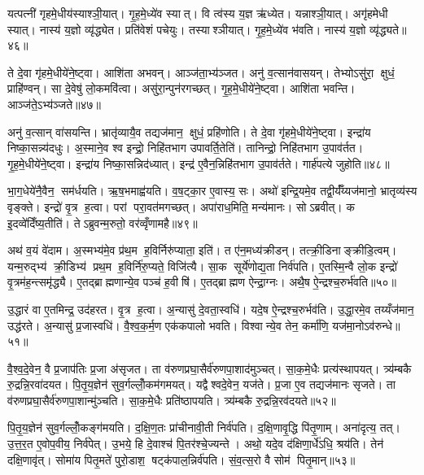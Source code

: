 यत्पत्नी॑ गृहमे॒धीय॑स्याश्ञी॒यात्। गृ॒ह॒मे॒ध्ये॑व स्यात्। वि त्व॑स्य य॒ज्ञ ऋ॑ध्येत। यन्नाश्ञी॒यात्। अगृ॑हमेधी स्यात्। नास्य॑ य॒ज्ञो व्यृ॑द्ध्येत। प्रति॑वेशं पचेयुः। तस्याश्ञीयात्। गृ॒ह॒मे॒ध्ये॑व भ॑वति। नास्य॑ य॒ज्ञो व्यृ॑द्ध्यते॥४६॥

ते दे॒वा गृ॑हमे॒धीये॑ने॒ष्ट्वा। आशि॑ता अभवन्। आञ्ज॑ता॒भ्य॑ञ्जत। अनु॑ व॒त्सान॑वासयन्। तेभ्योऽसु॑रा॒ क्षुधं॒ प्राहि॑ण्वन्। सा दे॒वेषु॑ लो॒कमवि॑त्वा। असु॑रा॒न्पुन॑रगच्छत्। गृ॒ह॒मे॒धीये॑ने॒ष्ट्वा। आशि॑ता भवन्ति। आञ्ज॑ते॒ऽभ्य॑ञ्जते॥४७॥

अनु॑ व॒त्सान् वा॑सयन्ति। भ्रातृ॑व्यायै॒व तद्यज॑मान॒ क्षुधं॒ प्रहि॑णोति। ते दे॒वा गृ॑हमे॒धीये॑ने॒ष्ट्वा। इन्द्रा॑य निष्का॒सन्न्य॑दधुः। अ॒स्माने॒व श्व इन्द्रो॒ निहि॑तभाग उपावर्ति॒तेति॑। तानिन्द्रो॒ निहि॑तभाग उ॒पाव॑र्तत। गृ॒ह॒मे॒धीये॑ने॒ष्ट्वा। इन्द्रा॑य निष्का॒सन्निद॑ध्यात्। इन्द्र॑ ए॒वैन॒न्निहि॑तभाग उ॒पाव॑र्तते। गार्\mbox{}ह॑पत्ये जुहोति॥४८॥

भा॒ग॒धेये॑नै॒वैन॒ सम॑र्धयति। ऋ॒ष॒भमाह्व॑यति। व॒ष॒ट्का॒र ए॒वास्य॒ सः। अथो॑ इन्द्रि॒यमे॒व तद्वी॒र्यँ॑य्यज॑मानो॒ भ्रातृव्य॑स्य वृङ्क्ते। इन्द्रो॑ वृ॒त्र ह॒त्वा। परां परा॒वत॑मगच्छत्। अपा॑राध॒मिति॒ मन्य॑मानः। सोऽब्रवीत्। क इ॒दव्वे॑दिँष्य॒तीति॑। तेऽब्रुवन्म॒रुतो॒ वर॑व्वृँणामहै॥४९॥

अथ॑ व॒यं वे॑दाम। अ॒स्मभ्य॑मे॒व प्र॑थ॒म ह॒विर्निरु॑प्याता॒ इति॑। त ए॑न॒मध्य॑क्रीडन्। तत्क्री॒डिनाङ्क्रीडि॒त्वम्। यन्म॒रुद्भ्य॑ क्री॒डिभ्य॑ प्रथ॒म ह॒विर्नि॑रु॒प्यते॒ विजि॑त्यै। सा॒क सूर्ये॑णोद्य॒ता निर्व॑पति। ए॒तस्मि॒न्वै लो॒क इन्द्रो॑ वृ॒त्रम॑ह॒न्त्समृ॑द्ध्यै। ए॒तद्ब्राह्मणान्ये॒व पञ्च॑ ह॒वीषि॑। ए॒तद्ब्राह्मण ऐन्द्रा॒ग्नः। अथै॒ष ऐ॒न्द्रश्च॒रुर्भ॑वति॥५०॥

उ॒द्धारं वा ए॒तमिन्द्र॒ उद॑हरत। वृ॒त्र ह॒त्वा। अ॒न्यासु॑ दे॒वता॒स्वधि॑। यदे॒ष ऐ॒न्द्रश्च॒रुर्भव॑ति। उ॒द्धा॒रमे॒व तय्यँज॑मान॒ उद्ध॑रते। अ॒न्यासु॑ प्र॒जास्वधि॑। वै॒श्व॒क॒र्म॒ण एक॑कपालो भवति। विश्वान्ये॒व तेन॒ कर्मा॑णि॒ यज॑मा॒नोऽव॑रुन्धे॥५१॥\anuvakamend[ऋ॒द्ध्य॒ते॒ऽभ्य॑ञ्जते जुहोति वृणामहै भवत्य॒ष्टौ च॑]

वै॒श्व॒दे॒वेन॒ वै प्र॒जाप॑तिः प्र॒जा अ॑सृजत। ता व॑रुणप्रघा॒सैर्व॑रुणपा॒शाद॑मुञ्चत्। सा॒क॒मे॒धैः प्रत्य॑स्थापयत्। त्र्य॑म्बकै रु॒द्रन्नि॒रवा॑दयत। पि॒तृ॒य॒ज्ञेन॑ सुव॒र्गल्लोँ॒कम॑गमयत्। यद्वैश्वदे॒वेन॒ यज॑ते। प्र॒जा ए॒व तद्यज॑मानः सृजते। ता व॑रुणप्रघा॒सैर्व॑रुणपा॒शान्मु॑ञ्चति। सा॒क॒मे॒धैः प्रति॑ष्ठापयति। त्र्य॑म्बकै रु॒द्रन्नि॒रव॑दयते॥५२॥

पि॒तृ॒य॒ज्ञेन॑ सुव॒र्गल्लोँ॒कङ्ग॑मयति। द॒क्षि॒ण॒तः प्रा॑चीनावी॒ती निर्व॑पति। द॒क्षि॒णावृ॒द्धि पि॑तृ॒णाम्। अना॑दृत्य॒ तत्। उ॒त्त॒र॒त ए॒वोप॒वीय॒ निर्व॑पेत्। उ॒भये॒ हि दे॒वाश्च॑ पि॒तर॑श्चे॒ज्यन्ते। अथो॒ यदे॒व द॑क्षिणा॒र्धे॑ऽधि॒ श्रय॑ति। तेन॑ दक्षि॒णावृ॑त्। सोमा॑य पितृ॒मते॑ पुरो॒डाश॒ षट्क॑पाल॒न्निर्व॑पति। सं॒व॒त्स॒रो वै सोम॑ पितृ॒मान्॥५३॥

